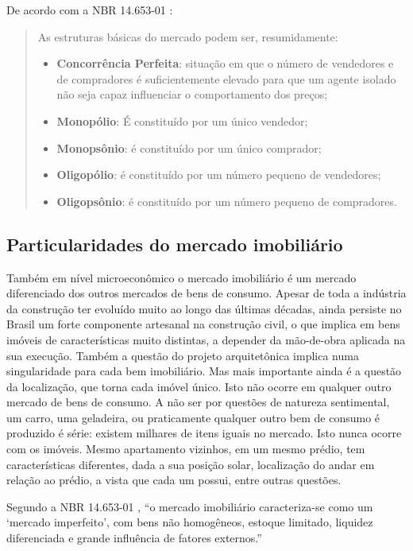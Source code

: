 \documentclass[
	12pt,				%
	oneside,			%
	a4paper,			%
	chapter=TITLE,		%
	section=TITLE,		%
	english,			%
	brazil				%
	]{abntex2}
\begin{document}
De acordo com a NBR 14.653-01 \autocite*[ix]{NBR1465301}:
\begin{quote}
As estruturas básicas do mercado podem ser, resumidamente:
\begin{itemize}
\item
  \textbf{Concorrência Perfeita}: situação em que o número de vendedores e de
  compradores é suficientemente elevado para que um agente isolado não seja
  capaz influenciar o comportamento dos preços;
\item
  \textbf{Monopólio}: É constituído por um único vendedor;
\item
  \textbf{Monopsônio}: é constituído por um único comprador;
\item
  \textbf{Oligopólio}: é constituído por um número pequeno de vendedores;
\item
  \textbf{Oligopsônio}: é constituído por um número pequeno de compradores.
\end{itemize}
\end{quote}
\hypertarget{particularidades-do-mercado-imobiliuxe1rio}{%
\subsection{Particularidades do mercado imobiliário}\label{particularidades-do-mercado-imobiliuxe1rio}}

Também em nível microeconômico o mercado imobiliário é um mercado diferenciado
dos outros mercados de bens de consumo. Apesar de toda a indústria da construção
ter evoluído muito ao longo das últimas décadas, ainda persiste no Brasil um
forte componente artesanal na construção civil, o que implica em bens imóveis
de características muito distintas, a depender da mão-de-obra aplicada na sua
execução. Também a questão do projeto arquitetônica implica numa singularidade
para cada bem imobiliário. Mas mais importante ainda é a questão da localização,
que torna cada imóvel único. Isto não ocorre em qualquer outro mercado de bens
de consumo. A não ser por questões de natureza sentimental, um carro, uma
geladeira, ou praticamente qualquer outro bem de consumo é produzido é série:
existem milhares de itens iguais no mercado. Isto nunca ocorre com os imóveis.
Mesmo apartamento vizinhos, em um mesmo prédio, tem características diferentes,
dada a sua posição solar, localização do andar em relação ao prédio, a vista
que cada um possui, entre outras questões.

Segundo a NBR 14.653-01 \autocite*[x]{NBR1465301}, ``o mercado imobiliário caracteriza-se
como um `mercado imperfeito', com bens não homogêneos, estoque limitado, liquidez
diferenciada e grande influência de fatores externos.''
\end{document}
